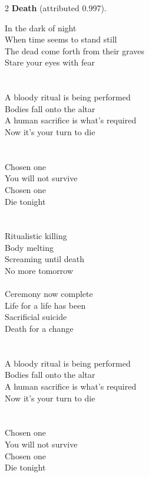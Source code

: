 \begin{multicols}{2}
\nopagebreak\noindent\textbf{Death} (attributed 0.997).\par\nopagebreak\vspace{4pt}
{\footnotesize\itshape\raggedright
In the dark of night \\
When time seems to stand still \\
The dead come forth from their graves \\
Stare your eyes with fear \\
\mbox{} \\
\mbox{} \\
A bloody ritual is being performed \\
Bodies fall onto the altar \\
A human sacrifice is what's required \\
Now it's your turn to die \\
\mbox{} \\
\mbox{} \\
Chosen one \\
You will not survive \\
Chosen one \\
Die tonight \\
\mbox{} \\
\mbox{} \\
Ritualistic killing \\
Body melting \\
Screaming until death \\
No more tomorrow \\
\mbox{} \\
Ceremony now complete \\
Life for a life has been \\
Sacrificial suicide \\
Death for a change \\
\mbox{} \\
\mbox{} \\
A bloody ritual is being performed \\
Bodies fall onto the altar \\
A human sacrifice is what's required \\
Now it's your turn to die \\
\mbox{} \\
\mbox{} \\
Chosen one \\
You will not survive \\
Chosen one \\
Die tonight \\
\mbox{} \\
}
\end{multicols}
